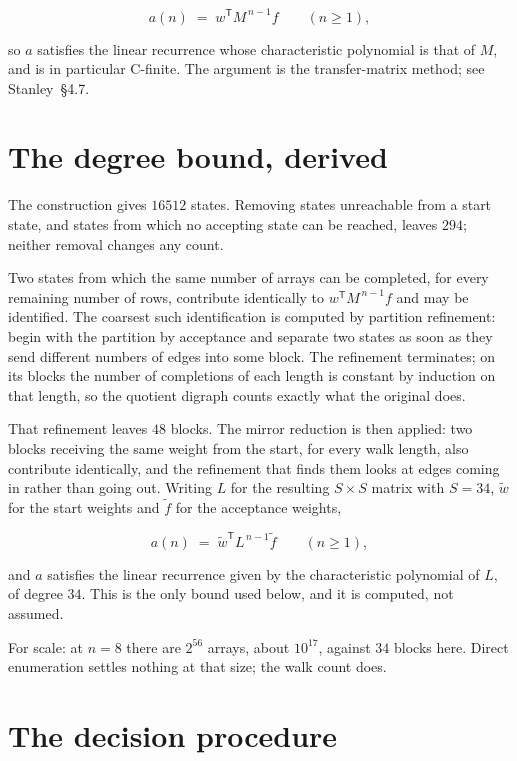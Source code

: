 \documentclass[11pt]{article}
\theoremstyle{definition}
\begin{document}
\[a(n) \;=\; w^{\mathsf T} M^{\,n-1} f \qquad (n \ge 1),\]

so $a$ satisfies the linear recurrence whose characteristic polynomial is that of $M$, and is in particular C-finite. The argument is the transfer-matrix method; see Stanley~\S4.7.

\section{The degree bound, derived}

The construction gives $16512$ states. Removing states unreachable from a start state, and states from which no accepting state can be reached, leaves $294$; neither removal changes any count.

Two states from which the same number of arrays can be completed, for every remaining number of rows, contribute identically to $w^{\mathsf T}M^{\,n-1}f$ and may be identified. The coarsest such identification is computed by partition refinement: begin with the partition by acceptance and separate two states as soon as they send different numbers of edges into some block. The refinement terminates; on its blocks the number of completions of each length is constant by induction on that length, so the quotient digraph counts exactly what the original does.

That refinement leaves $48$ blocks. The mirror reduction is then applied: two blocks receiving the same weight from the start, for every walk length, also contribute identically, and the refinement that finds them looks at edges coming in rather than going out. Writing $L$ for the resulting $S \times S$ matrix with $S = 34$, $\tilde w$ for the start weights and $\tilde f$ for the acceptance weights,

\[a(n) \;=\; \tilde w^{\mathsf T} L^{\,n-1} \tilde f \qquad (n \ge 1),\]

and $a$ satisfies the linear recurrence given by the characteristic polynomial of $L$, of degree $34$. This is the only bound used below, and it is computed, not assumed.

For scale: at $n = 8$ there are $2^{56}$ arrays, about $10^{17}$, against $34$ blocks here. Direct enumeration settles nothing at that size; the walk count does.

\section{The decision procedure}
\end{document}
